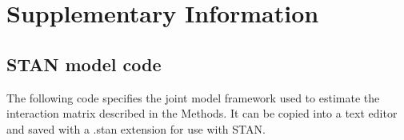 \documentclass[a4,12pt]{article}
\begin{document}
% 
% 

\newpage

\printbibliography   

\newpage 

\section{Supplementary Information}

    \subsection{STAN model code}

    The following code specifies the joint model framework used to estimate the interaction matrix described in the Methods. It can be copied into a text editor and saved with a .stan extension for use with STAN. 

    
\end{document}
